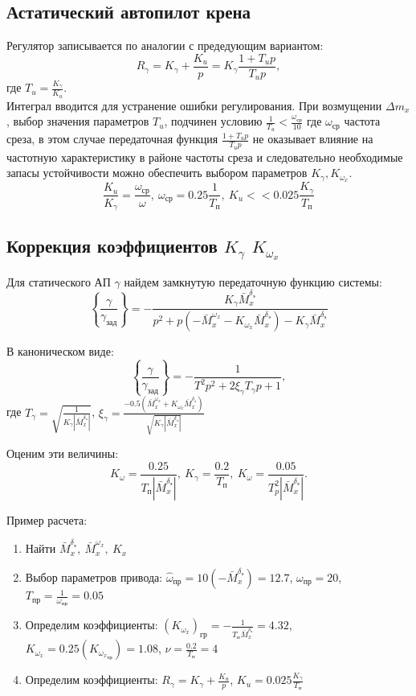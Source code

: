 \documentclass{article}
\begin{document}
\subsection{Астатический автопилот крена}
Регулятор записывается по аналогии с предедующим вариантом:
\[
	R_\gamma = K_\gamma +\frac{K_u}{p}  = K_\gamma\frac{1 + T_u p}{T_u p},
\]
где $T_u  = \frac{K_\gamma}{K_u}$.\\
Интеграл вводится для устранение ошибки регулирования. При возмущении $\Delta m_x$, выбор значения параметров $T_u$, подчинен условию $\frac{1}{T_u} < \frac{\omega_\text{ср}}{10}$ где $\omega_\text{ср}$ частота среза, в этом случае передаточная функция $\frac{1 + T_u p}{T_u p}$ не оказывает влияние на частотную характеристику в районе частоты среза и следовательно необходимые запасы устойчивости можно обеспечить выбором параметров $K_\gamma, K_{\omega_x}$.
\[
	\frac{K_u}{K_\gamma} =\frac{\omega_\text{ср}}{\omega}, \ \omega_\text{ср} = 0.25\frac{1}{T_\text{п}}, \ K_u << 0.025\frac{K_\gamma}{T_\text{п}}
\]
\subsection{Коррекция коэффициентов \texorpdfstring{$K_\gamma$}{Lg} \texorpdfstring{$K_{\omega_x}$}{Lg}}
Для статического АП $\gamma$ найдем замкнутую передаточную функцию системы:
\[
	\left\{\frac{\gamma}{\gamma_\text{зад}}\right\} = -\frac{K_\gamma \bar{M}_x^{\delta_\text{э}}}{p^2 + p(-\bar{M}_x^{\omega_x} - K_{\omega_x} \bar{M}_x^{\delta_\text{э}}) - K_{\gamma} \bar{M}_x^{\delta_\text{э}}} 
\]

В каноническом виде:
\[
	\left\{\frac{\gamma}{\gamma_\text{зад}}\right\} = -\frac{1}{T^2 p^2 + 2\xi_{\gamma} T_{\gamma} p + 1},
\]
где $T_\gamma = \sqrt{\frac{1}{K_\gamma |\bar{M}_x^{\delta_\text{э}}|}}$, $\xi_{\gamma} = \frac{-0.5(\bar{M}_x^{\omega_x} + K_{\omega_x} \bar{M}_x^{\delta_\text{э}})}{\sqrt{K_\gamma |\bar{M}_x^{\delta_\text{э}}|}}$

Оценим эти величины:
\[
	K_\omega =\frac{0.25}{T_\text{п}|\bar{M}_x^{\delta_\text{э}}|},\ K_\gamma = \frac{0.2}{T_\text{п}},\ K_\omega =\frac{0.05}{T_p^2 |\bar{M}_x^{\delta_\text{э}}|}.
\]

Пример расчета:
\begin{enumerate}
	\item Найти $\bar{M}_x ^{\delta_\text{э}},\ \bar{M}_x^{\omega_x},\ K_x$
	\item Выбор параметров привода:
	      $\hat{\omega}_\text{пр} = 10(-\bar{M}_x^{\delta_\text{э}}) =  12.7$, $\omega_\text{пр} = 20$, $T_\text{пр} = \frac{1}{\omega_\text{пр}} = 0.05$
	\item Определим коэффициенты:
	      $(K_{\omega_x})_\text{гр} = -\frac{1}{T_\text{п} \bar{M}_x^{\delta_\text{э}}}=4.32$, $K_{\omega_x} = 0.25 (K_{{\omega_x}_\text{гр}}) = 1.08$, $\nu =\frac{0.2}{T_\text{п}}=4$
	\item Определим коэффициенты: $R_\gamma = K_\gamma +\frac{K_u}{p}$, $K_u = 0.025 \frac{K_\gamma}{T_\text{п}}$
\end{enumerate}
\end{document}
